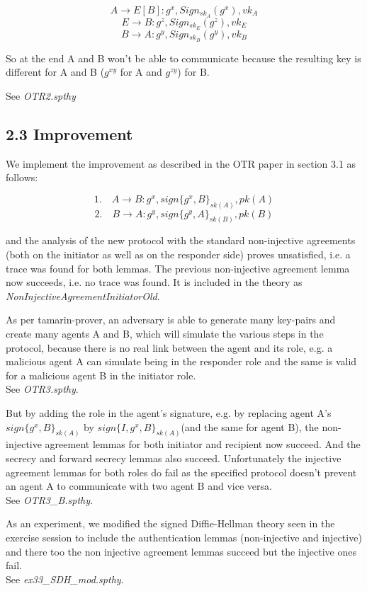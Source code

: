 \documentclass[
]{article}
\begin{document}
\[ A \rightarrow E[B] : g^x, Sign_{sk_A} (g^x), vk_A \]
\[ E \rightarrow B : g^z, Sign_{sk_E} (g^z), vk_E \]
\[ B \rightarrow A : g^y, Sign_{sk_B} (g^y), vk_B \]

So at the end A and B won't be able to communicate because the resulting key is different for A and B ($g^{xy}$ for A and $g^{zy }$) for B.

See \emph{OTR2.spthy}

\newpage
\hypertarget{improvement}{%
\subsection{2.3 Improvement}\label{improvement}}

We implement the improvement as described in the OTR paper in section 3.1 as follows:

\[ \text{1.} \quad A \rightarrow B: g^x, sign\{g^x, B\}_{sk(A)}, pk(A) \]
\[ \text{2.} \quad B \rightarrow A: g^y, sign\{g^y, A\}_{sk(B)}, pk(B) \]

and the analysis of the new protocol with the standard non-injective agreements (both on the initiator as well as on the responder side) proves unsatisfied, i.e. a trace was found for both lemmas. The previous non-injective agreement lemma now succeeds, i.e. no trace was found. It is included in the theory as \emph{NonInjectiveAgreementInitiatorOld}.

As per tamarin-prover, an adversary is able to generate many key-pairs and create many agents A and B, which will simulate the various steps in the protocol, because there is no real link between the agent and its role, e.g. a malicious agent A can simulate being in the responder role and the same is valid for a malicious agent B in the initiator role.\\
See \emph{OTR3.spthy}.

But by adding the role in the agent's signature, e.g. by replacing agent A's  $sign\{g^x, B\}_{sk(A)}$  by  $sign\{I, g^x, B\}_{sk(A)}$(and the same for agent B), the non-injective agreement lemmas for both initiator and recipient now succeed. And the secrecy and forward secrecy lemmas also succeed. Unfortunately the injective agreement lemmas for both roles do fail as the specified protocol doesn't prevent an agent A to communicate with two agent B and vice versa. \\
See \emph{OTR3\_B.spthy}.

As an experiment, we modified the signed Diffie-Hellman theory seen in the exercise session to include the authentication lemmas (non-injective and injective) and there too the non injective agreement lemmas succeed but the injective ones fail. \\
See \emph{ex33\_SDH\_mod.spthy}.
\end{document}
